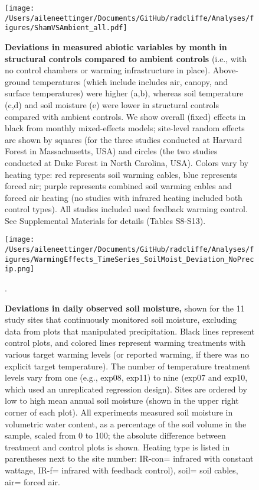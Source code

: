 \documentclass{article}
\begin{document}
 \begin{figure}[h]
\centering
\texttt{[image: /Users/aileneettinger/Documents/GitHub/radcliffe/Analyses/figures/ShamVSAmbient\_all.pdf]} 
 \caption{\textbf{Deviations in measured abiotic variables by month in structural controls compared to ambient controls} (i.e., with no control chambers or warming infrastructure in place). Above-ground temperatures (which include includes air, canopy, and surface temperatures) were higher (a,b), whereas soil temperature (c,d) and soil moisture (e) were lower in structural controls compared with ambient controls. We show overall (fixed) effects in black from monthly mixed-effects models; site-level random effects are shown by squares (for the three studies conducted at Harvard Forest in Massachusetts, USA) and circles (the two studies conducted at Duke Forest in North Carolina, USA). Colors vary by heating type: red represents soil warming cables, blue represents forced air; purple represents combined soil warming cables and forced air heating (no studies with infrared heating included both control types). All studies included used feedback warming control. See Supplemental Materials for details (Tables S8-S13). }
 \label{fig:shamamb}
 \end{figure}
\clearpage
 \begin{figure}[h!]
 \centering
 \texttt{[image: /Users/aileneettinger/Documents/GitHub/radcliffe/Analyses/figures/WarmingEffects\_TimeSeries\_SoilMoist\_Deviation\_NoPrecip.png]} 
 \caption{\textbf{Deviations in daily observed soil moisture,} shown for the 11 study sites that continuously monitored soil moisture, excluding data from plots that manipulated precipitation. Black lines represent control plots, and colored lines represent warming treatments with various target warming levels (or reported warming, if there was no explicit target temperature). The number of temperature treatment levels vary from one (e.g., exp08, exp11) to nine (exp07 and exp10, which used an unreplicated regression design). Sites are ordered by low to high mean annual soil moisture (shown in the upper right corner of each plot). All experiments measured soil moisture in volumetric water content, as a percentage of the soil volume in the sample, scaled from 0 to 100; the absolute difference between treatment and control plots is shown. Heating type is listed in parentheses next to the site number: IR-con= infrared with constant wattage, IR-f= infrared with feedback control), soil= soil cables, air= forced air.}. 
 \label{fig:mois}
 \end{figure}
\end{document}
